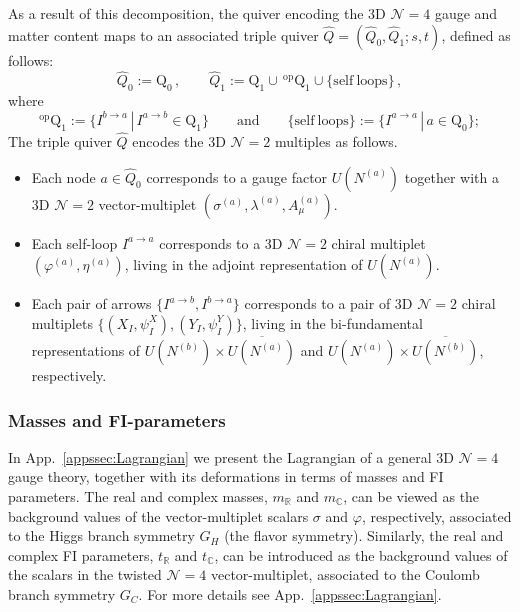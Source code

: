 \documentclass[12pt,a4paper]{article}
\renewcommand{\(}{\left(}
\renewcommand{\)}{\right)}
\renewcommand{\(}{\left(}
\renewcommand{\)}{\right)}
\begin{document}
As a result of this decomposition, the quiver encoding the 3D $\mathcal{N}=4$ gauge and matter content maps to an associated triple quiver $\widehat{Q}=(\widehat{Q}_0,\widehat{Q}_1; s,t)$, defined as follows:
\begin{equation}\label{eq:tripleQuiver}
\widehat{Q}_0:=\mathrm{Q}_0\,, \qquad \widehat{Q}_1:=\mathrm{Q}_1\cup \,  {}^{\textrm{op}}\mathrm{Q}_1\cup
	\{\mathrm{self\ loops}\}\,,
\end{equation}
where
\begin{equation}\label{eq:tripleQ1}
	{}^{\textrm{op}}\mathrm{Q}_1:=\{I^{b\rightarrow a}\, |\, I^{a\rightarrow b} \in \mathrm{Q}_1\}
	\qquad\textrm{and} \qquad
	\{\mathrm{self\ loops}\}:=\{I^{a\rightarrow a}\,|\, a\in \mathrm{Q}_0\};
\end{equation}
The triple quiver $\widehat{Q}$ encodes the 3D $\mathcal{N}=2$ multiples as follows.
\begin{itemize}
\item Each node $a\in \widehat{Q}_0$ corresponds to a gauge factor $U(N^{(a)})$ together with a 3D $\mathcal{N}=2$ vector-multiplet $(\sigma^{(a)}, \lambda^{(a)}, A^{(a)}_{\mu})$.
	\item Each self-loop $I^{a\rightarrow a}$ corresponds to a 3D $\mathcal{N}=2$ chiral multiplet $(\varphi^{(a)},\eta^{(a)})$, living in the adjoint representation of $U(N^{(a)})$.
	\item Each pair of arrows $\{I^{a\rightarrow b},I^{b\rightarrow a}\}$ corresponds to a pair of 3D $\mathcal{N}=2$ chiral multiplets $\{(X_I,\psi^X_I),(Y_I,\psi^Y_I)\}$, living in the bi-fundamental representations of $U(N^{(b)})\times \overline{U(N^{(a)})}$ and $U(N^{(a)})\times \overline{U(N^{(b)})}$, respectively.
\end{itemize}
 




\subsubsection{Masses and FI-parameters}

In App.~\ref{appssec:Lagrangian} we present the Lagrangian of a general 3D $\mathcal{N}=4 $ gauge theory, together with its deformations in terms of masses and FI parameters. 
The real and complex masses, $m_{\mathbb{R}}$ and $m_{\mathbb{C}}$, can be viewed as the background values of the vector-multiplet scalars $\sigma$ and $\varphi$, respectively, associated to the Higgs branch symmetry $G_H$ (the flavor symmetry). 
Similarly, the real and complex FI parameters, $t_{\mathbb{R}}$ and $t_{\mathbb{C}}$, can be introduced as the background values of the scalars in the twisted $\mathcal{N}=4$ vector-multiplet, associated to the Coulomb branch  symmetry $G_C$.
For more details see App.~\ref{appssec:Lagrangian}.
\end{document}
